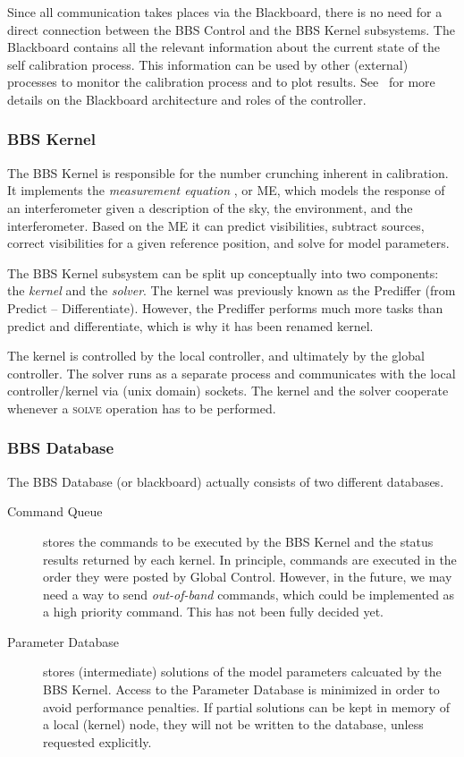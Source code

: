 \documentclass[10pt]{lofar}
\newcommand{\solve}{\textsc{solve}\xspace}
\begin{document}
Since all communication takes places via the Blackboard, there is no need for
a direct connection between the BBS Control and the BBS Kernel subsystems.
The Blackboard contains all the relevant information about the current state
of the self calibration process. This information can be used by other
(external) processes to monitor the calibration process and to plot results.
See~\cite{LOFAR-ASTRON-SDD-002} for more details on the Blackboard
architecture and roles of the controller.

\subsubsection{BBS Kernel}
\label{subsubsec:sys-kernel}

The BBS Kernel is responsible for the number crunching inherent in calibration.
It implements the \emph{measurement equation} \cite{Hamaker1996-1, aips++note185},
or ME, which models the response of an interferometer given a description of
the sky, the environment, and the interferometer. Based on the ME it can
predict visibilities, subtract sources, correct visibilities for a given
reference position, and solve for model parameters.

The BBS Kernel subsystem can be split up conceptually into two components: the
\emph{kernel} and the \emph{solver}. The kernel was previously known as the
Prediffer (from Predict -- Differentiate). However, the Prediffer performs much
more tasks than predict and differentiate, which is why it has been renamed
kernel.

The kernel is controlled by the local controller, and ultimately by the global
controller. The solver runs as a separate process and communicates with the
local controller/kernel via (unix domain) sockets. The kernel and the solver
cooperate whenever a \solve operation has to be performed.

\subsubsection{BBS Database}
\label{subsubsec:sys-database}
The BBS Database (or blackboard) actually consists of two different databases.

\begin{description}
\item [Command Queue] stores the commands to be executed by the BBS Kernel and
the status results returned by each kernel. In principle, commands are executed
in the order they were posted by Global Control. However, in the future, we may
need a way to send \emph{out-of-band} commands, which could be implemented as a
high priority command. This has not been fully decided yet.
\item [Parameter Database] stores (intermediate) solutions of the model
parameters calcuated by the BBS Kernel. Access to the Parameter Database is
minimized in order to avoid performance penalties. If partial solutions can be
kept in memory of a local (kernel) node, they will not be written to the
database, unless requested explicitly.
\end{description}
\end{document}
